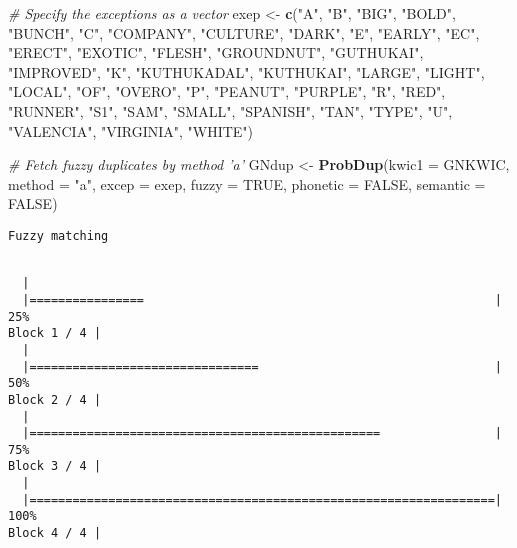 \documentclass[]{article}
\newenvironment{Shaded}{\begin{snugshade}}{\end{snugshade}}
\newcommand{\CommentTok}[1]{\textcolor[rgb]{0.56,0.35,0.01}{\textit{#1}}}
\newcommand{\DataTypeTok}[1]{\textcolor[rgb]{0.13,0.29,0.53}{#1}}
\newcommand{\KeywordTok}[1]{\textcolor[rgb]{0.13,0.29,0.53}{\textbf{#1}}}
\newcommand{\NormalTok}[1]{#1}
\newcommand{\OtherTok}[1]{\textcolor[rgb]{0.56,0.35,0.01}{#1}}
\newcommand{\StringTok}[1]{\textcolor[rgb]{0.31,0.60,0.02}{#1}}
\begin{document}
\begin{Shaded}
\begin{Highlighting}[]
\CommentTok{# Specify the exceptions as a vector}
\NormalTok{exep <-}\StringTok{ }\KeywordTok{c}\NormalTok{(}\StringTok{"A"}\NormalTok{, }\StringTok{"B"}\NormalTok{, }\StringTok{"BIG"}\NormalTok{, }\StringTok{"BOLD"}\NormalTok{, }\StringTok{"BUNCH"}\NormalTok{, }\StringTok{"C"}\NormalTok{, }\StringTok{"COMPANY"}\NormalTok{, }\StringTok{"CULTURE"}\NormalTok{,}
         \StringTok{"DARK"}\NormalTok{, }\StringTok{"E"}\NormalTok{, }\StringTok{"EARLY"}\NormalTok{, }\StringTok{"EC"}\NormalTok{, }\StringTok{"ERECT"}\NormalTok{, }\StringTok{"EXOTIC"}\NormalTok{, }\StringTok{"FLESH"}\NormalTok{, }\StringTok{"GROUNDNUT"}\NormalTok{,}
         \StringTok{"GUTHUKAI"}\NormalTok{, }\StringTok{"IMPROVED"}\NormalTok{, }\StringTok{"K"}\NormalTok{, }\StringTok{"KUTHUKADAL"}\NormalTok{, }\StringTok{"KUTHUKAI"}\NormalTok{, }\StringTok{"LARGE"}\NormalTok{,}
         \StringTok{"LIGHT"}\NormalTok{, }\StringTok{"LOCAL"}\NormalTok{, }\StringTok{"OF"}\NormalTok{, }\StringTok{"OVERO"}\NormalTok{, }\StringTok{"P"}\NormalTok{, }\StringTok{"PEANUT"}\NormalTok{, }\StringTok{"PURPLE"}\NormalTok{, }\StringTok{"R"}\NormalTok{,}
         \StringTok{"RED"}\NormalTok{, }\StringTok{"RUNNER"}\NormalTok{, }\StringTok{"S1"}\NormalTok{, }\StringTok{"SAM"}\NormalTok{, }\StringTok{"SMALL"}\NormalTok{, }\StringTok{"SPANISH"}\NormalTok{, }\StringTok{"TAN"}\NormalTok{, }\StringTok{"TYPE"}\NormalTok{,}
         \StringTok{"U"}\NormalTok{, }\StringTok{"VALENCIA"}\NormalTok{, }\StringTok{"VIRGINIA"}\NormalTok{, }\StringTok{"WHITE"}\NormalTok{)}

\CommentTok{# Fetch fuzzy duplicates by method 'a'}
\NormalTok{GNdup <-}\StringTok{ }\KeywordTok{ProbDup}\NormalTok{(}\DataTypeTok{kwic1 =}\NormalTok{ GNKWIC, }\DataTypeTok{method =} \StringTok{"a"}\NormalTok{, }\DataTypeTok{excep =}\NormalTok{ exep, }\DataTypeTok{fuzzy =} \OtherTok{TRUE}\NormalTok{,}
                 \DataTypeTok{phonetic =} \OtherTok{FALSE}\NormalTok{, }\DataTypeTok{semantic =} \OtherTok{FALSE}\NormalTok{)}
\end{Highlighting}
\end{Shaded}

\begin{verbatim}
Fuzzy matching
\end{verbatim}

\begin{verbatim}

  |                                                                       
  |================                                                 |  25%
Block 1 / 4 |
  |                                                                       
  |================================                                 |  50%
Block 2 / 4 |
  |                                                                       
  |=================================================                |  75%
Block 3 / 4 |
  |                                                                       
  |=================================================================| 100%
Block 4 / 4 |
\end{verbatim}
\end{document}
